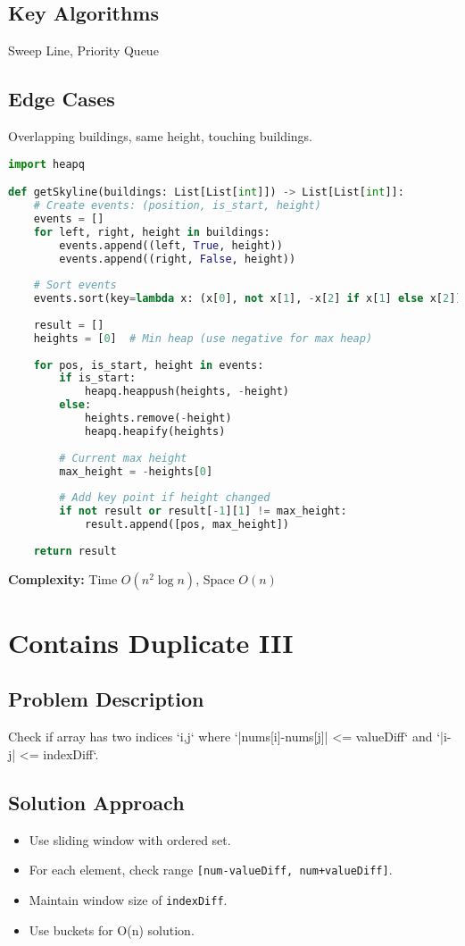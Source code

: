 \documentclass[10pt, a4paper]{article}
\begin{document}
\subsection*{Key Algorithms}
Sweep Line, Priority Queue

\subsection*{Edge Cases}
Overlapping buildings, same height, touching buildings.

\begin{lstlisting}[language=Python]
import heapq

def getSkyline(buildings: List[List[int]]) -> List[List[int]]:
    # Create events: (position, is_start, height)
    events = []
    for left, right, height in buildings:
        events.append((left, True, height))
        events.append((right, False, height))
    
    # Sort events
    events.sort(key=lambda x: (x[0], not x[1], -x[2] if x[1] else x[2]))
    
    result = []
    heights = [0]  # Min heap (use negative for max heap)
    
    for pos, is_start, height in events:
        if is_start:
            heapq.heappush(heights, -height)
        else:
            heights.remove(-height)
            heapq.heapify(heights)
        
        # Current max height
        max_height = -heights[0]
        
        # Add key point if height changed
        if not result or result[-1][1] != max_height:
            result.append([pos, max_height])
    
    return result
\end{lstlisting}
\textbf{Complexity:} Time $O(n^2 \log n)$, Space $O(n)$

\section{Contains Duplicate III}
\subsection*{Problem Description}
Check if array has two indices `i,j` where `|nums[i]-nums[j]| <= valueDiff` and `|i-j| <= indexDiff`.

\subsection*{Solution Approach}
\begin{itemize}
    \item Use sliding window with ordered set.
    \item For each element, check range \texttt{[num-valueDiff, num+valueDiff]}.
    \item Maintain window size of \texttt{indexDiff}.
    \item Use buckets for O(n) solution.
\end{itemize}
\end{document}
